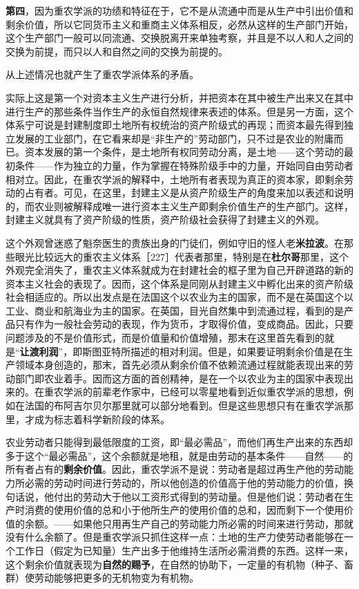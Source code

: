 \textbf{第四}，因为重农学派的功绩和特征在于，它不是从流通中而是从生产中引出价值和剩余价值，所以它同货币主义和重商主义体系相反，必然从这样的生产部门开始，这个生产部门一般可以同流通、交换脱离开来单独考察，并且是不以人和人之间的交换为前提，而只以人和自然之间的交换为前提的。


从上述情况也就产生了重农学派体系的矛盾。

实际上这是第一个对资本主义生产进行分析，并把资本在其中被生产出来又在其中进行生产的那些条件当作生产的永恒自然规律来表述的体系。但是另一方面，这个体系宁可说是封建制度即土地所有权统治的资产阶级式的再现；而资本最先得到独立发展的工业部门，在它看来却是“非生产的”劳动部门，只不过是农业的附庸而已。资本发展的第一个条件，是土地所有权同劳动分离，是土地——这个劳动的最初条件——作为独立的力量，作为掌握在特殊阶级手中的力量，开始同自由劳动者相对立。因此，在重农学派的解释中，土地所有者表现为真正的资本家，即剩余劳动的占有者。可见，在这里，封建主义是从资产阶级生产的角度来加以表述和说明的，而农业则被解释成唯一进行资本主义生产即剩余价值生产的生产部门。这样，封建主义就具有了资产阶级的性质，资产阶级社会获得了封建主义的外观。

这个外观曾迷惑了魁奈医生的贵族出身的门徒们，例如守旧的怪人老\textbf{米拉波}。在那些眼光比较远大的重农主义体系［227］代表者那里，特别是在\textbf{杜尔哥}那里，这个外观完全消失了，重农主义体系就成为在封建社会的框子里为自己开辟道路的新的资本主义社会的表现了。因而，这个体系是同刚从封建主义中孵化出来的资产阶级社会相适应的。所以出发点是在法国这个以农业为主的国家，而不是在英国这个以工业、商业和航海业为主的国家。在英国，目光自然集中到流通过程，看到的是产品只有作为一般社会劳动的表现，作为货币，才取得价值，变成商品。因此，只要问题涉及的不是价值形式，而是价值量和价值增殖，那末在这里首先看到的就是“\textbf{让渡利润}”，即斯图亚特所描述的相对利润。但是，如果要证明剩余价值是在生产领域本身创造的，那末，首先必须从剩余价值不依赖流通过程就能表现出来的劳动部门即农业着手。因而这方面的首创精神，是在一个以农业为主的国家中表现出来的。在重农学派的前辈老作家中，已经可以零星地看到近似重农学派的思想，例如在法国的布阿吉尔贝尔那里就可以部分地看到。但是这些思想只有在重农学派那里，才成为标志着科学新阶段的体系。

农业劳动者只能得到最低限度的工资，即“最必需品”，而他们再生产出来的东西却多于这个“最必需品”，这个余额就是地租，就是由劳动的基本条件——自然——的所有者占有的\textbf{剩余价值}。因此，重农学派不是说：劳动者是超过再生产他的劳动能力所必需的劳动时间进行劳动的，所以他创造的价值高于他的劳动能力的价值，换句话说，他付出的劳动大于他以工资形式得到的劳动量。但是他们说：劳动者在生产时消费的使用价值的总和小于他所生产的使用价值的总和，因而剩下一个使用价值的余额。——如果他只用再生产自己的劳动能力所必需的时间来进行劳动，那就没有什么余额了。但是重农学派只抓住这样一点：土地的生产力使劳动者能够在一个工作日（假定为已知量）生产出多于他维持生活所必需消费的东西。这样一来，这个剩余价值就表现为\textbf{自然的赐予}，在自然的协助下，一定量的有机物（种子、畜群）使劳动能够把更多的无机物变为有机物。

